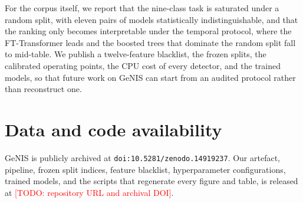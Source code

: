 \documentclass[review,12pt]{elsarticle}
\newcommand{\todo}[1]{\textcolor{red}{[TODO: #1]}}
\begin{document}
For the corpus itself, we report that the nine-class task is saturated under a random
split, with eleven pairs of models statistically indistinguishable, and that the ranking
only becomes interpretable under the temporal protocol, where the FT-Transformer leads
and the boosted trees that dominate the random split fall to mid-table. We publish a
twelve-feature blacklist, the frozen splits, the calibrated operating points, the CPU cost
of every detector, and the trained models, so that future work on GeNIS can start from an
audited protocol rather than reconstruct one.

\section*{Data and code availability}
GeNIS is publicly archived at \texttt{doi:10.5281/zenodo.14919237}. Our artefact,
pipeline, frozen split indices, feature blacklist, hyperparameter configurations,
trained models, and the scripts that regenerate every figure and table, is released at
\todo{repository URL and archival DOI}.



\end{document}

